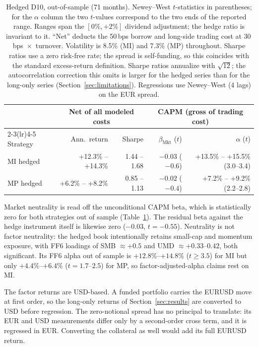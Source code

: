 \documentclass[11pt,a4paper]{article}
\begin{document}
\begin{table}[!htbp]
\centering
\small
\begin{tabular}{lrrrr}
\toprule
 & \multicolumn{2}{c}{Net of all modeled costs} & \multicolumn{2}{c}{CAPM (gross of trading cost)} \\
\cmidrule(lr){2-3}\cmidrule(lr){4-5}
Strategy & Ann.\ return & Sharpe & $\beta_{\mathrm{Mkt}}$ ($t$) & $\alpha$ ($t$) \\
\midrule
MI hedged & +12.3\% -- +14.3\% & 1.44 -- 1.68 & $-0.03$ ($-0.6$) & +13.5\% -- +15.5\% (3.0--3.4) \\
MP hedged & +6.2\% -- +8.2\%   & 0.85 -- 1.13 & $-0.02$ ($-0.4$) & +7.2\% -- +9.2\% (2.2--2.8) \\
\bottomrule
\end{tabular}
\caption{Hedged D10, out-of-sample (71 months). Newey--West $t$-statistics in
parentheses; for the $\alpha$ column the two $t$-values correspond to the two
ends of the reported range. Ranges span the $[0\%, +2\%]$
dividend adjustment; the hedge ratio is invariant to it. ``Net'' deducts the
50\,bps borrow and long-side trading cost at 30\,bps~$\times$~turnover.
Volatility is 8.5\% (MI) and 7.3\% (MP) throughout. Sharpe ratios use a zero
risk-free rate; the spread is self-funding, so this coincides with the
standard excess-return definition. Sharpe ratios annualize with
$\sqrt{12}$; the autocorrelation correction this omits is larger for the
hedged series than for the long-only series (Section~\ref{sec:limitations}).
Regressions use
Newey--West (4 lags) on the EUR spread.}
\label{tab:hedged}
\end{table}

Market neutrality is read off the unconditional CAPM beta, which is
statistically zero for both strategies out of sample
(Table~\ref{tab:hedged}). The residual beta against the hedge instrument
itself is likewise zero ($-0.03$, $t{=}-0.55$). Neutrality is not factor
neutrality: the hedged book intentionally retains small-cap and momentum
exposure, with FF6 loadings of SMB $\approx +0.5$ and UMD
$\approx +0.33$--$0.42$, both significant. Its FF6 alpha out of sample is
$+12.8\%$--$+14.8\%$ ($t \geq 3.5$) for MI but only $+4.4\%$--$+6.4\%$
($t = 1.7$--$2.5$) for MP, so factor-adjusted-alpha claims rest on MI.

The factor returns are USD-based. A funded portfolio carries the EURUSD
move at first order, so the long-only returns of Section~\ref{sec:results}
are converted to USD before regression. The zero-notional spread has no
principal to translate: its EUR and USD measurements differ only by a
second-order cross term, and it is regressed in EUR. Converting the
collateral as well would add its full EURUSD return.
\end{document}

